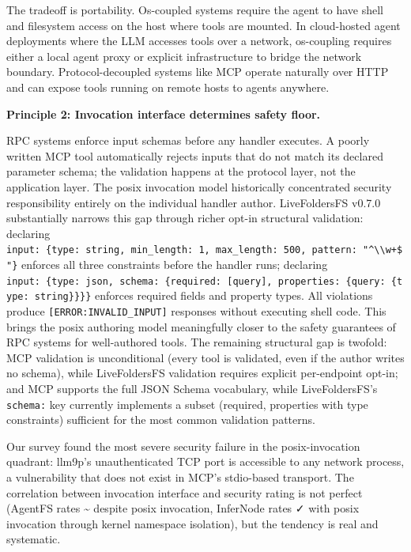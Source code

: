 \documentclass[
  11pt,
]{article}
\begin{document}
The tradeoff is portability. Os-coupled systems require the agent to
have shell and filesystem access on the host where tools are mounted. In
cloud-hosted agent deployments where the LLM accesses tools over a
network, os-coupling requires either a local agent proxy or explicit
infrastructure to bridge the network boundary. Protocol-decoupled
systems like MCP operate naturally over HTTP and can expose tools
running on remote hosts to agents anywhere.

\textbf{Principle 2: Invocation interface determines safety floor.}

RPC systems enforce input schemas before any handler executes. A poorly
written MCP tool automatically rejects inputs that do not match its
declared parameter schema; the validation happens at the protocol layer,
not the application layer. The posix invocation model historically
concentrated security responsibility entirely on the individual handler
author. LiveFoldersFS v0.7.0 substantially narrows this gap through
richer opt-in structural validation: declaring
\texttt{input:\ \{type:\ string,\ min\_length:\ 1,\ max\_length:\ 500,\ pattern:\ "\^{}\textbackslash{}\textbackslash{}w+\$"\}}
enforces all three constraints before the handler runs; declaring
\texttt{input:\ \{type:\ json,\ schema:\ \{required:\ {[}query{]},\ properties:\ \{query:\ \{type:\ string\}\}\}\}}
enforces required fields and property types. All violations produce
\texttt{{[}ERROR:INVALID\_INPUT{]}} responses without executing shell
code. This brings the posix authoring model meaningfully closer to the
safety guarantees of RPC systems for well-authored tools. The remaining
structural gap is twofold: MCP validation is unconditional (every tool
is validated, even if the author writes no schema), while LiveFoldersFS
validation requires explicit per-endpoint opt-in; and MCP supports the
full JSON Schema vocabulary, while LiveFoldersFS's \texttt{schema:} key
currently implements a subset (required, properties with type
constraints) sufficient for the most common validation patterns.

Our survey found the most severe security failure in the
posix-invocation quadrant: llm9p's unauthenticated TCP port is
accessible to any network process, a vulnerability that does not exist
in MCP's stdio-based transport. The correlation between invocation
interface and security rating is not perfect (AgentFS rates
\textasciitilde{} despite posix invocation, InferNode rates ✓ with posix
invocation through kernel namespace isolation), but the tendency is real
and systematic.
\end{document}

